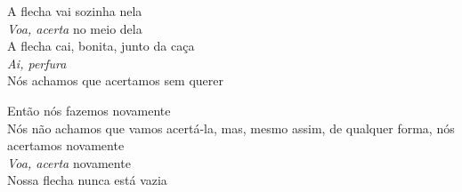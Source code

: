  \smallskip
 \begin{center}\end{center}
 \smallskip
 
\noindent  A flecha vai sozinha nela\\
 \textit{Voa, acerta} no meio dela\\
 A flecha cai, bonita, junto da caça\\
 \textit{Ai, perfura}\\
 Nós achamos que acertamos sem querer
 
 \smallskip
 \begin{center}\end{center}
 \smallskip
 
\noindent  Então nós fazemos novamente\\
 Nós não achamos que vamos acertá-la, mas, mesmo assim, de qualquer forma, nós acertamos novamente\\
 \textit{Voa, acerta} novamente\\
 Nossa flecha nunca está vazia
 
 \smallskip
 \begin{center}\end{center}
 \smallskip
 
